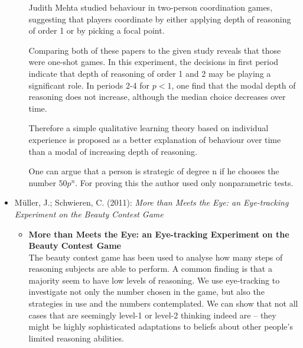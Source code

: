 \begin{itemize}
\begin{itemize}
			Judith Mehta studied behaviour in two-person coordination games, suggesting that players coordinate by either applying depth of reasoning of order 1 or by picking a focal point.
			
			Comparing both of these papers to the given study reveals that those were one-shot games. In this experiment, the decisions in first period indicate that depth of reasoning of order 1 and 2 may be playing a significant role. In periods 2-4 for $p < 1$, one find that the modal depth of reasoning does not increase, although the median choice decreases over time.
			
			Therefore a simple qualitative learning theory based on individual experience is proposed as a better explanation of behaviour over time than a modal of increasing depth of reasoning.
			
			One can argue that a person is strategic of degree n if he chooses the number $50p^{n}$. For proving this the author used only nonparametric tests. 
	
		\end{itemize}
	\item Müller, J.; Schwieren, C. (2011): \textit{More than Meets the Eye: an Eye-tracking Experiment on the Beauty Contest Game}
		\begin{itemize}
			\item \textbf{More than Meets the Eye: an Eye-tracking Experiment on the Beauty Contest Game}  \\
			The beauty contest game has been used to analyse how many steps of reasoning subjects are able to perform. A common finding is that a majority seem to have low levels of reasoning. We use eye-tracking to investigate not only the number chosen in the game, but also the strategies in use and the numbers contemplated. We can show that not all cases that are seemingly level-1 or level-2 thinking indeed are – they might be highly sophisticated adaptations to beliefs about other people’s limited reasoning abilities.
		\end{itemize}
\end{itemize}		

\newpage